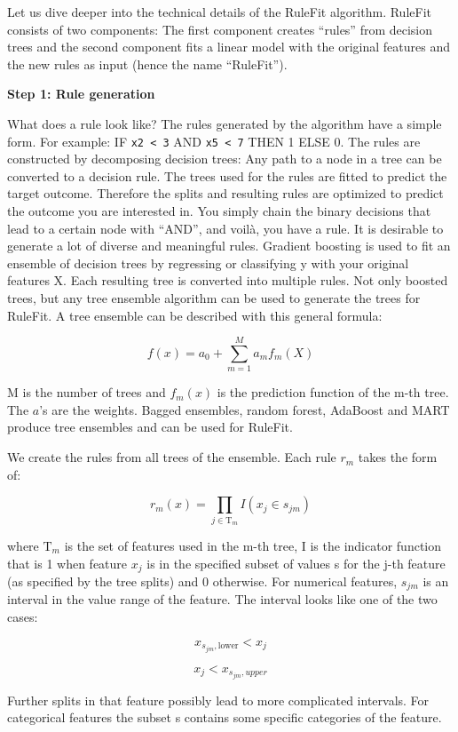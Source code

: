 \documentclass[12pt,]{krantz}
\begin{document}
Let us dive deeper into the technical details of the RuleFit algorithm.
RuleFit consists of two components: The first component creates
``rules'' from decision trees and the second component fits a linear
model with the original features and the new rules as input (hence the
name ``RuleFit'').

\textbf{Step 1: Rule generation}

What does a rule look like? The rules generated by the algorithm have a
simple form. For example: IF \texttt{x2\ \textless{}\ 3} AND
\texttt{x5\ \textless{}\ 7} THEN 1 ELSE 0. The rules are constructed by
decomposing decision trees: Any path to a node in a tree can be
converted to a decision rule. The trees used for the rules are fitted to
predict the target outcome. Therefore the splits and resulting rules are
optimized to predict the outcome you are interested in. You simply chain
the binary decisions that lead to a certain node with ``AND'', and
voilà, you have a rule. It is desirable to generate a lot of diverse and
meaningful rules. Gradient boosting is used to fit an ensemble of
decision trees by regressing or classifying y with your original
features X. Each resulting tree is converted into multiple rules. Not
only boosted trees, but any tree ensemble algorithm can be used to
generate the trees for RuleFit. A tree ensemble can be described with
this general formula:

\[f(x)=a_0+\sum_{m=1}^M{}a_m{}f_m(X)\]

M is the number of trees and \(f_m(x)\) is the prediction function of
the m-th tree. The \(a\)'s are the weights. Bagged ensembles, random
forest, AdaBoost and MART produce tree ensembles and can be used for
RuleFit.

We create the rules from all trees of the ensemble. Each rule \(r_m\)
takes the form of:

\[r_m(x)=\prod_{j\in\text{T}_m}I(x_j\in{}s_{jm})\]

where \(\text{T}_{m}\) is the set of features used in the m-th tree, I
is the indicator function that is 1 when feature \(x_j\) is in the
specified subset of values s for the j-th feature (as specified by the
tree splits) and 0 otherwise. For numerical features, \(s_{jm}\) is an
interval in the value range of the feature. The interval looks like one
of the two cases:

\[x_{s_{jm},\text{lower}}<x_j\]

\[x_j<x_{s_{jm},upper}\]

Further splits in that feature possibly lead to more complicated
intervals. For categorical features the subset s contains some specific
categories of the feature.
\end{document}
